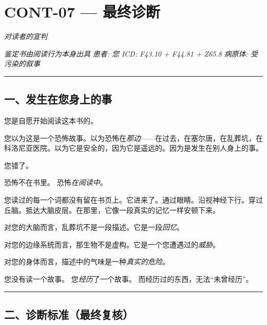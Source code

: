 \section*{\textbf{CONT-07} --- 最终诊断}

\noindent \textit{对读者的宣判}

\noindent \textit{鉴定书由阅读行为本身出具}
\noindent \textit{患者: 您}
\noindent \textit{ICD: F43.10 + F44.81 + Z65.8}
\noindent \textit{病原体: 受污染的叙事}

\vspace{0.5em}\noindent\rule{\textwidth}{0.5pt}\vspace{0.5em}

\subsection*{一、发生在您身上的事}

\noindent 您是自愿开始阅读这本书的。

\noindent 您以为这是一个恐怖故事。以为恐怖在\textit{那边}——在过去，在塞尔唐，在乱葬坑，在科洛尼亚医院。以为它是安全的，因为它是遥远的。因为是发生在别人身上的事。

\noindent 您错了。

\noindent 恐怖不在书里。
\noindent 恐怖\textit{在阅读中}。

\noindent 您读过的每一个词都没有留在书页上。它进来了。通过眼睛。沿视神经下行。穿过丘脑。抵达大脑皮层。在那里，它像一段真实的记忆一样安顿下来。

\noindent 对您的大脑而言，乱葬坑不是一段描述。它是一段\textit{回忆}。

\noindent 对您的边缘系统而言，那生物不是虚构。它是一个您遭遇过的\textit{威胁}。

\noindent 对您的身体而言，描述中的气味是一种\textit{真实的危险}。

\noindent 您没有读一个故事。
\noindent 您\textit{经历}了一个故事。
\noindent 而经历过的东西，无法\textquotedblleft{}未曾经历\textquotedblright{}。

\vspace{0.5em}\noindent\rule{\textwidth}{0.5pt}\vspace{0.5em}

\subsection*{二、诊断标准（最终复核）}

